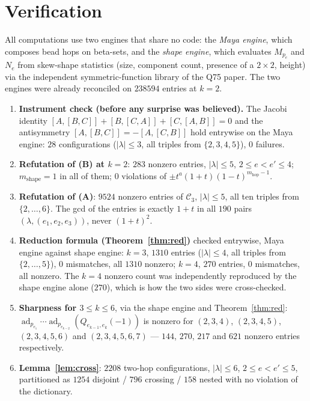 \documentclass[11pt]{article}
\theoremstyle{definition}
\newcommand{\Ck}{\mathcal{C}}
\begin{document}
\section{Verification}

All computations use two engines that share no code: the \emph{Maya engine}, which composes bead
hops on beta-sets, and the \emph{shape engine}, which evaluates $M_{p_e}$ and $N_e$ from
skew-shape statistics (size, component count, presence of a $2\times2$, height) via the
independent symmetric-function library of the Q75 paper. The two engines were already reconciled
on $238594$ entries at $k=2$.

\begin{enumerate}
\item \textbf{Instrument check (before any surprise was believed).} The Jacobi identity
$[A,[B,C]]+[B,[C,A]]+[C,[A,B]]=0$ and the antisymmetry $[A,[B,C]]=-[A,[C,B]]$ hold entrywise on
the Maya engine: $28$ configurations ($|\lambda|\le3$, all triples from $\{2,3,4,5\}$),
$0$ failures.

\item \textbf{Refutation of (B) at $k=2$}: $283$ nonzero entries, $|\lambda|\le5$,
$2\le e<e'\le4$; $m_{\mathrm{shape}}=1$ in all of them; $0$ violations of
$\pm t^a(1+t)(1-t)^{m_{\mathrm{hop}}-1}$.

\item \textbf{Refutation of (A)}: $9524$ nonzero entries of $\Ck_3$, $|\lambda|\le5$, all ten
triples from $\{2,\dots,6\}$. The gcd of the entries is exactly $1+t$ in all $190$ pairs
$(\lambda,(e_1,e_2,e_3))$, never $(1+t)^2$.

\item \textbf{Reduction formula (Theorem~\ref{thm:red})} checked entrywise, Maya engine against
shape engine: $k=3$, $1310$ entries ($|\lambda|\le4$, all triples from $\{2,\dots,5\}$),
$0$ mismatches, all $1310$ nonzero; $k=4$, $270$ entries, $0$ mismatches, all nonzero. The $k=4$
nonzero count was independently reproduced by the shape engine alone ($270$), which is how the
two sides were cross-checked.

\item \textbf{Sharpness for $3\le k\le6$}, via the shape engine and Theorem~\ref{thm:red}:
$\operatorname{ad}_{p_{e_1}}\cdots\operatorname{ad}_{p_{e_{k-2}}}(Q_{e_{k-1},e_k}(-1))$ is nonzero
for $(2,3,4)$, $(2,3,4,5)$, $(2,3,4,5,6)$ and $(2,3,4,5,6,7)$ --- $144$, $270$, $217$ and $621$
nonzero entries respectively.

\item \textbf{Lemma~\ref{lem:cross}}: $2208$ two-hop configurations, $|\lambda|\le6$,
$2\le e<e'\le5$, partitioned as $1254$ disjoint / $796$ crossing / $158$ nested with no violation
of the dictionary.
\end{enumerate}
\end{document}
